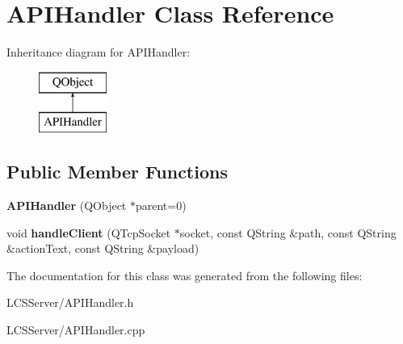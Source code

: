 \hypertarget{class_a_p_i_handler}{}\section{A\+P\+I\+Handler Class Reference}
\label{class_a_p_i_handler}
Inheritance diagram for A\+P\+I\+Handler\+:\begin{figure}[H]
\begin{center}
\leavevmode
\includegraphics[height=2.000000cm]{class_a_p_i_handler}
\end{center}
\end{figure}
\subsection*{Public Member Functions}
\begin{DoxyCompactItemize}
\item 
\mbox{\label{class_a_p_i_handler_a8aff359d1271283f9805d08f9ace18fa}} 
{\bfseries A\+P\+I\+Handler} (Q\+Object $\ast$parent=0)
\item 
\mbox{\label{class_a_p_i_handler_a4edb58b7fa3ef34613241a3509fd8f54}} 
void {\bfseries handle\+Client} (Q\+Tcp\+Socket $\ast$socket, const Q\+String \&path, const Q\+String \&action\+Text, const Q\+String \&payload)
\end{DoxyCompactItemize}


The documentation for this class was generated from the following files\+:\begin{DoxyCompactItemize}
\item 
L\+C\+S\+Server/A\+P\+I\+Handler.\+h\item 
L\+C\+S\+Server/A\+P\+I\+Handler.\+cpp\end{DoxyCompactItemize}
